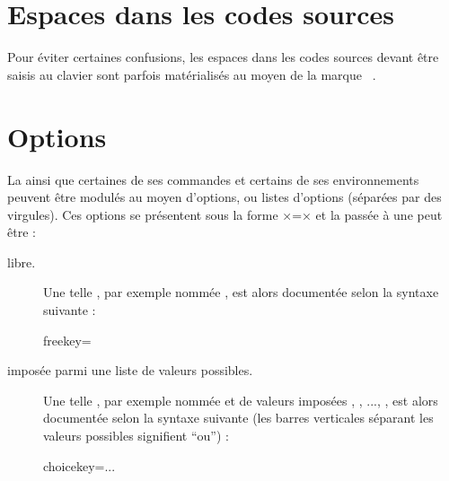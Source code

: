 \section{Espaces dans les codes sources}
\label{sec:espaces-dans-les}

Pour éviter certaines confusions, les espaces dans les codes sources devant
être saisis au clavier sont parfois matérialisés au moyen de la marque
\lstinline[showspaces]+ +.

\section{Options}
\label{sec:options}

La \yatcl{} ainsi que certaines de ses commandes et certains de ses
environnements peuvent être modulés au moyen d'options, ou listes d'options
(séparées par des virgules). Ces options se présentent sous la forme
×=× et la  passée à une  peut
être :
\begin{description}
\item[libre.] Une telle , par exemple nommée , est
  alors documentée selon la syntaxe suivante :
  \begin{docKey*}{freekey}{=}{}
  \end{docKey*}
\item[imposée parmi une liste de valeurs possibles.] Une telle , par
  exemple nommée  et de valeurs imposées ,
  , ..., , est alors documentée selon la
  syntaxe suivante (les barres verticales séparant les valeurs possibles
  signifient \enquote{ou}) :
  \begin{docKey*}{choicekey}{=\textbar{}\textbar...\textbar{}}{}
  \end{docKey*}
\end{description}

